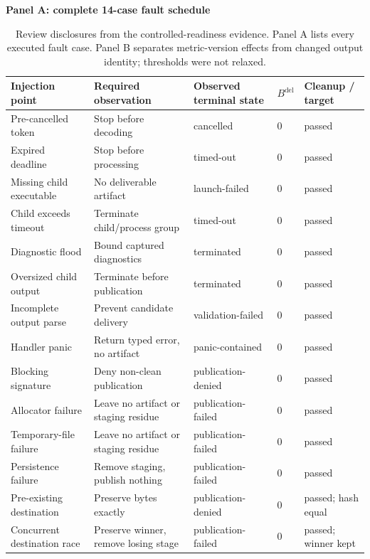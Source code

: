 \begin{table}[t]
\centering
\caption{Review disclosures from the controlled-readiness evidence. Panel A
lists every executed fault case. Panel B separates metric-version effects from
changed output identity; thresholds were not relaxed.}
\label{tab:review-disclosures}
\begingroup
\scriptsize
\setlength{\tabcolsep}{2.5pt}
\renewcommand{\arraystretch}{0.94}
\textbf{Panel A: complete 14-case fault schedule}\\[-0.4ex]
\begin{tabularx}{\textwidth}{L{0.20\textwidth}L{0.36\textwidth}L{0.18\textwidth}L{0.07\textwidth}Y}
\toprule
Injection point & Required observation & Observed terminal state & \(B^{\mathrm{del}}\) & Cleanup / target \\
\midrule
Pre-cancelled token & Stop before decoding & cancelled & 0 & passed \\
Expired deadline & Stop before processing & timed-out & 0 & passed \\
Missing child executable & No deliverable artifact & launch-failed & 0 & passed \\
Child exceeds timeout & Terminate child/process group & timed-out & 0 & passed \\
Diagnostic flood & Bound captured diagnostics & terminated & 0 & passed \\
Oversized child output & Terminate before publication & terminated & 0 & passed \\
Incomplete output parse & Prevent candidate delivery & validation-failed & 0 & passed \\
Handler panic & Return typed error, no artifact & panic-contained & 0 & passed \\
Blocking signature & Deny non-clean publication & publication-denied & 0 & passed \\
Allocator failure & Leave no artifact or staging residue & publication-failed & 0 & passed \\
Temporary-file failure & Leave no artifact or staging residue & publication-failed & 0 & passed \\
Persistence failure & Remove staging, publish nothing & publication-failed & 0 & passed \\
Pre-existing destination & Preserve bytes exactly & publication-denied & 0 & passed; hash equal \\
Concurrent destination race & Preserve winner, remove losing stage & publication-failed & 0 & passed; winner kept \\
\bottomrule
\end{tabularx}

\end{table}
